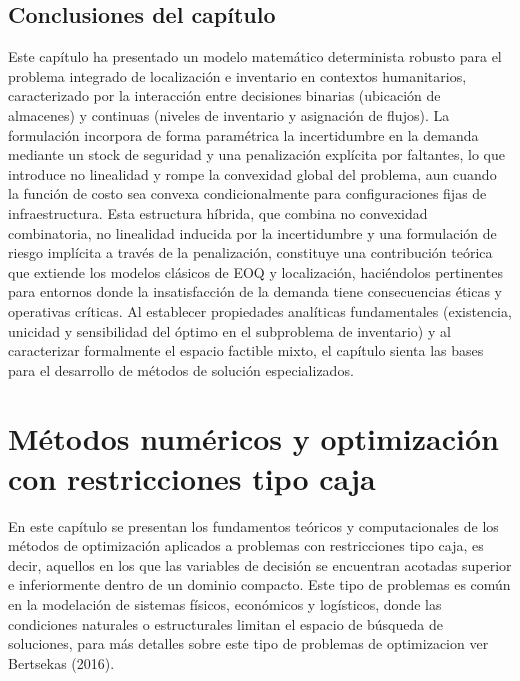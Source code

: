 \documentclass[
  spanish,
  us-letterpaper,
  DIV=11,
  numbers=noendperiod]{scrreprt}
\numberwithin{equation}{section}
\begin{document}
\section{Conclusiones del capítulo}\label{conclusiones-del-capuxedtulo}

Este capítulo ha presentado un modelo matemático determinista robusto
para el problema integrado de localización e inventario en contextos
humanitarios, caracterizado por la interacción entre decisiones binarias
(ubicación de almacenes) y continuas (niveles de inventario y asignación
de flujos). La formulación incorpora de forma paramétrica la
incertidumbre en la demanda mediante un stock de seguridad y una
penalización explícita por faltantes, lo que introduce no linealidad y
rompe la convexidad global del problema, aun cuando la función de costo
sea convexa condicionalmente para configuraciones fijas de
infraestructura. Esta estructura híbrida, que combina no convexidad
combinatoria, no linealidad inducida por la incertidumbre y una
formulación de riesgo implícita a través de la penalización, constituye
una contribución teórica que extiende los modelos clásicos de EOQ y
localización, haciéndolos pertinentes para entornos donde la
insatisfacción de la demanda tiene consecuencias éticas y operativas
críticas. Al establecer propiedades analíticas fundamentales
(existencia, unicidad y sensibilidad del óptimo en el subproblema de
inventario) y al caracterizar formalmente el espacio factible mixto, el
capítulo sienta las bases para el desarrollo de métodos de solución
especializados.


\chapter{Métodos numéricos y optimización con restricciones tipo
caja}\label{muxe9todos-numuxe9ricos-y-optimizaciuxf3n-con-restricciones-tipo-caja}

En este capítulo se presentan los fundamentos teóricos y computacionales
de los métodos de optimización aplicados a problemas con restricciones
tipo caja, es decir, aquellos en los que las variables de decisión se
encuentran acotadas superior e inferiormente dentro de un dominio
compacto. Este tipo de problemas es común en la modelación de sistemas
físicos, económicos y logísticos, donde las condiciones naturales o
estructurales limitan el espacio de búsqueda de soluciones, para más
detalles sobre este tipo de problemas de optimizacion ver Bertsekas
(2016).
\end{document}
